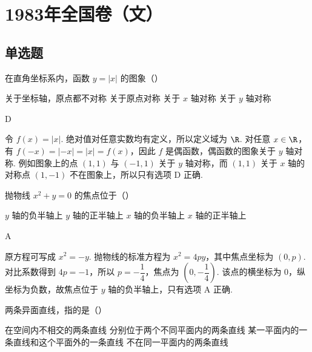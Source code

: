 \documentclass[UTF8,a4paper,oneside,11pt]{ctexbook}
\begin{document}
\mainmatter

\chapter{1983年全国卷（文）}

\section{单选题}

\begin{problem}
在直角坐标系内，函数 \( y = |x| \) 的图象（\quad）

\choices
    {关于坐标轴，原点都不对称}
    {关于原点对称}
    {关于 \(x\) 轴对称}
    {关于 \(y\) 轴对称}
\end{problem}

\begin{answer}
D
\end{answer}

\begin{solution}
令 \(f(x)=|x|\). 绝对值对任意实数均有定义，所以定义域为 \(\R\). 对任意 \(x\in\R\)，有 \(f(-x)=|-x|=|x|=f(x)\)，因此 \(f\) 是偶函数，偶函数的图象关于 \(y\) 轴对称. 例如图象上的点 \((1,1)\) 与 \((-1,1)\) 关于 \(y\) 轴对称，而 \((1,1)\) 关于 \(x\) 轴的对称点 \((1,-1)\) 不在图象上，所以只有选项 D 正确.
\end{solution}

\begin{problem}
抛物线 \(x^{2} + y = 0\) 的焦点位于（\quad）

\choices
    {\(y\) 轴的负半轴上}
    {\(y\) 轴的正半轴上}
    {\(x\) 轴的负半轴上}
    {\(x\) 轴的正半轴上}
\end{problem}

\begin{answer}
A
\end{answer}

\begin{solution}
原方程可写成 \(x^2=-y\). 抛物线的标准方程为 \(x^2=4py\)，其中焦点坐标为 \((0,p)\). 对比系数得到 \(4p=-1\)，所以 \(p=-\dfrac14\)，焦点为 \(\left(0,-\dfrac14\right)\). 该点的横坐标为 \(0\)，纵坐标为负数，故焦点位于 \(y\) 轴的负半轴上，只有选项 A 正确.
\end{solution}

\begin{problem}
两条异面直线，指的是（\quad）

\choices
    {在空间内不相交的两条直线}
    {分别位于两个不同平面内的两条直线}
    {某一平面内的一条直线和这个平面外的一条直线}
    {不在同一平面内的两条直线}
\end{problem}
\end{document}
